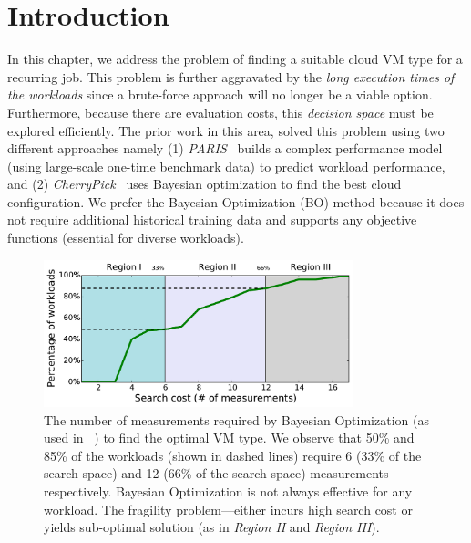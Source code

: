 \section{Introduction}
\label{sec:introduction}



In this chapter, we address the problem of finding a suitable cloud
VM type for a recurring job.
This problem is further aggravated by
the \textit{long execution times of the workloads} since a brute-force approach will no longer be a viable option.
Furthermore, because there are evaluation costs, this
\emph{decision space} must be explored efficiently.
The prior work in this area, solved this problem using two different approaches namely (1)
\emph{PARIS}~\cite{Yadwadkar2017} builds a complex performance model (using
large-scale one-time benchmark data) to predict workload performance, and
(2) \emph{CherryPick}~\cite{Alipourfard2017} uses Bayesian optimization to find the best cloud configuration.
We prefer the Bayesian Optimization (BO) method because
it does not require additional historical training data and
supports any objective functions (essential for diverse workloads).


\begin{figure}[!htbp]
    \centering
    \includegraphics[width=0.8\textwidth]{figures/motivation_fragile_cost.pdf}
    \caption{The number of measurements required by Bayesian Optimization (as used in ~\cite{Alipourfard2017}) to find the optimal VM type. We observe that 50\% and 85\% of the workloads (shown in dashed lines) require 6 (33\% of the search space) and 12 (66\% of the search space) measurements respectively. Bayesian Optimization is not always effective for any workload.
    The fragility problem---either incurs high search cost or yields sub-optimal solution (as in \emph{Region II} and \emph{Region III}).}
    \label{fig:cherrypick_issue1}
\end{figure}


